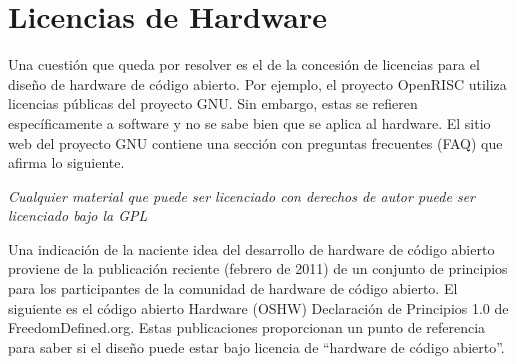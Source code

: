 
\section{Licencias de Hardware}

Una cuestión que queda por resolver es el de la concesión de licencias
para el diseño de hardware de código abierto. Por ejemplo, el proyecto
OpenRISC utiliza licencias públicas del proyecto GNU. Sin embargo,
estas se refieren específicamente a software y no se sabe bien que se
aplica al hardware. El sitio web del proyecto GNU contiene una sección
con preguntas frecuentes (FAQ) que afirma lo siguiente.

\textit{Cualquier material que puede ser licenciado con derechos de
autor puede ser licenciado bajo la GPL}



Una indicación de la naciente idea del desarrollo de hardware de
código abierto proviene de la publicación reciente (febrero de 2011)
de un conjunto de principios para los participantes de la comunidad de
hardware de código abierto. El siguiente es el código abierto Hardware
(OSHW) Declaración de Principios 1.0 de FreedomDefined.org. Estas
publicaciones proporcionan un punto de referencia para saber si el
diseño puede estar bajo licencia de ``hardware de código abierto''.


